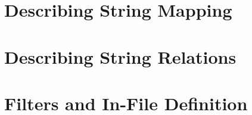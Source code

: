 \section{Describing String Mapping}

\label{Ref:Key:Map}


\section{Describing String Relations}


\section{Filters and In-File Definition}





